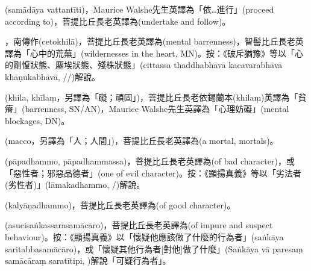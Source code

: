 \startitemgroup[noteitems]
\item{}(samādāya vattantīti)，Maurice Walshe先生英譯為「依…進行」(proceed according to)，菩提比丘長老英譯為(undertake and follow)。
\stopitemgroup

\startitemgroup[noteitems]
\item{}，南傳作(cetokhilā)，菩提比丘長老英譯為(mental barrenness)，智髻比丘長老英譯為「心中的荒蕪」(wildernesses in the heart, MN)。按：《破斥猶豫》等以「心的剛愎狀態、塵埃狀態、殘株狀態」(cittassa thaddhabhāvā kacavarabhāvā khāṇukabhāvā, //)解說。
\item{}(khila, khīlaṃ，另譯為「礙；頑固」)，菩提比丘長老依錫蘭本(khilaṃ)英譯為「貧瘠」(barrenness, SN/AN)，Maurice Walshe先生英譯為「心理妨礙」(mental blockages, DN)。
\stopitemgroup

\startitemgroup[noteitems]
\item{}(macco，另譯為「人；人間」)，菩提比丘長老英譯為(a mortal, mortals)。
\stopitemgroup

\startitemgroup[noteitems]
\item{}(pāpadhammo, pāpadhammassa)，菩提比丘長老英譯為(of bad character)，或「惡性者；邪惡品德者」(one of evil character)。按：《顯揚真義》等以「劣法者(劣性者)」(lāmakadhammo, /)解說。
\item{}(kalyāṇadhammo)，菩提比丘長老英譯為(of good character)。
\stopitemgroup

\startitemgroup[noteitems]
\item{}(asucisaṅkassarasamācāro)，菩提比丘長老英譯為(of impure and suspect behaviour)。按：《顯揚真義》以「懷疑他應該做了什麼的行為者」(saṅkāya saritabbasamācāro)，或「懷疑其他行為者[對他]做了什麼」(Saṅkāya vā paresaṃ samācāraṃ saratītipi, )解說「可疑行為者」。
\stopitemgroup

